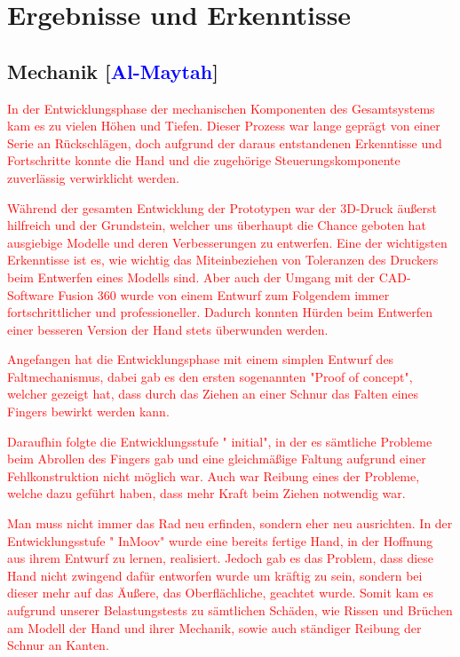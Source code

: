 \documentclass[titlepage,12pt,twoside]{article}
\begin{document}
\newpage
\section{Ergebnisse und Erkenntisse}
\label{chap:Ergebnisse und Erkenntisse}
\subsection{Mechanik [\textcolor{blue}{Al-Maytah}]}
\textcolor{red}{
	In der Entwicklungsphase der mechanischen Komponenten des Gesamtsystems kam es zu vielen Höhen und Tiefen.
	Dieser Prozess war lange geprägt von einer Serie an Rückschlägen, doch aufgrund der daraus entstandenen
	Erkenntisse und Fortschritte konnte die Hand und die zugehörige Steuerungskomponente zuverlässig verwirklicht werden.
	
	Während der gesamten Entwicklung der Prototypen war der 3D-Druck äußerst hilfreich und der Grundstein, welcher uns
	überhaupt die Chance geboten hat ausgiebige Modelle und deren Verbesserungen zu entwerfen. Eine der wichtigsten Erkenntisse
	ist es, wie wichtig das Miteinbeziehen von Toleranzen des Druckers beim Entwerfen eines Modells sind. Aber auch der Umgang mit der CAD-Software Fusion 360 
	wurde von einem Entwurf zum Folgendem immer fortschrittlicher und professioneller. Dadurch konnten Hürden beim Entwerfen einer besseren Version der 
	Hand stets überwunden werden.
	
	Angefangen hat die Entwicklungsphase mit einem simplen Entwurf des Faltmechanismus, dabei gab es den ersten sogenannten "Proof of concept", welcher gezeigt hat, dass durch das Ziehen an einer Schnur das Falten eines Fingers bewirkt werden kann.
	
	Daraufhin folgte die Entwicklungsstufe " initial", in der es sämtliche Probleme beim Abrollen des Fingers gab
	und eine gleichmäßige Faltung aufgrund einer Fehlkonstruktion nicht möglich war. Auch war Reibung eines
	der Probleme, welche dazu geführt haben, dass mehr Kraft beim Ziehen notwendig war.
	
	Man muss nicht immer das Rad neu erfinden, sondern eher neu ausrichten. In der Entwicklungsstufe " InMoov" wurde eine bereits fertige Hand, in der Hoffnung aus ihrem Entwurf zu lernen, realisiert. Jedoch gab es das Problem, dass diese Hand nicht zwingend dafür entworfen wurde um kräftig zu sein, sondern bei dieser mehr auf das Äußere, das Oberflächliche, geachtet wurde. Somit kam es aufgrund unserer Belastungstests zu sämtlichen Schäden, wie Rissen und Brüchen am Modell der Hand und ihrer Mechanik, sowie auch ständiger Reibung der Schnur an Kanten.
	
}
\end{document}
